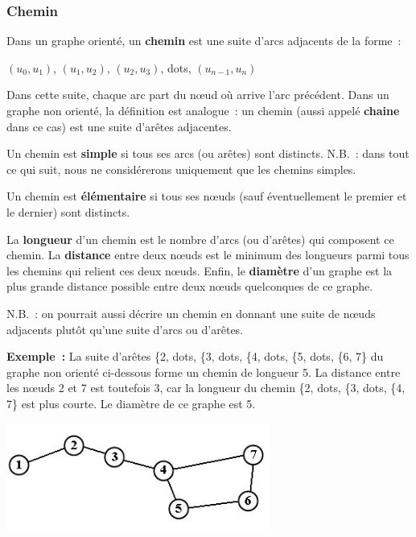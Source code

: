 		\subsubsection{Chemin}
		
			Dans un graphe orienté, un \textbf{chemin} est une 
			suite d'arcs adjacents de la forme~:

			\begin{center}
			$(u_0, u_1)$, $(u_1, u_2)$, $(u_2, u_3)$, {dots}, $(u_{n-1}, u_n)$
			\end{center}

			Dans cette suite, chaque arc part du n{\oe}ud où arrive 
			l'arc précédent. Dans un graphe non orienté, la définition est
			analogue~: un chemin (aussi appelé \textbf{chaine} dans ce cas) 
			est une suite d'arêtes adjacentes. 

			Un chemin est \textbf{simple} si tous ses arcs (ou arêtes) sont distincts. 
			N.B.~: dans tout ce qui suit, nous ne considérerons uniquement 
			que les chemins simples.

			Un chemin est \textbf{élémentaire} si tous ses n{\oe}uds 
			(sauf éventuellement le premier et le dernier) sont distincts.


			La \textbf{longueur} d'un chemin est le nombre d'arcs (ou d'arêtes) 
			qui composent ce chemin. La \textbf{distance} entre deux n{\oe}uds 
			est le minimum des longueurs parmi tous les chemins qui relient 
			ces deux n{\oe}uds. Enfin, le \textbf{diamètre} d'un graphe est la 
			plus grande distance possible entre deux n{\oe}uds quelconques 
			de ce graphe.

			N.B.~: on pourrait aussi décrire un chemin en donnant une suite de 
			n{\oe}uds adjacents plutôt qu'une suite d'arcs ou d'arêtes.

			\textbf{Exemple~:} 
			La suite d'arêtes \{2, {dots}, \{3, {dots}, \{4, {dots}, \{5, {dots}, \{6, 7\} 
			du graphe non orienté ci-dessous forme un chemin de longueur 5. 
			La distance entre les n{\oe}uds 2 et 7 est toutefois 3, 
			car la longueur du chemin \{2, {dots}, \{3, {dots}, \{4, 7\} est plus courte. 
			Le diamètre de ce graphe est 5.

			\begin{center}
			\includegraphics[width=8.641cm,height=3.542cm]{image/a2012Logique2eme-img047.jpg}
			\end{center}
			
